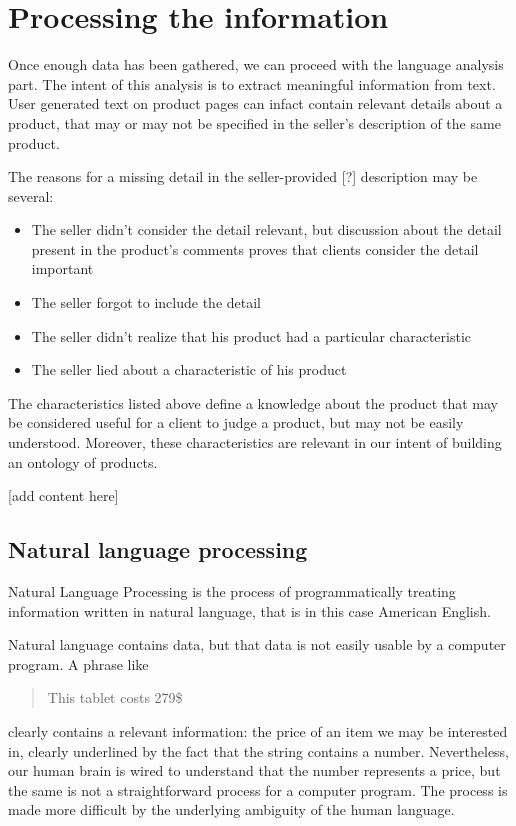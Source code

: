 \documentclass[LaM,binding=0.6cm]{sapthesis}
\begin{document}
\chapter{Processing the information}

Once enough data has been gathered, we can proceed with the language analysis part.
The intent of this analysis is to extract meaningful information from text. User generated text on product pages can infact contain relevant details about a product, that may or may not be specified in the seller's description of the same product. 

The reasons for a missing detail in the seller-provided [?] description may be several:
\begin{itemize}
	\item The seller didn't consider the detail relevant, but discussion about the detail present in the product's comments proves that clients consider the detail important
	\item The seller forgot to include the detail
	\item The seller didn't realize that his product had a particular characteristic
	\item The seller lied about a characteristic of his product
\end{itemize}

The characteristics listed above define a knowledge about the product that may be considered useful for a client to judge a product, but may not be easily understood. Moreover, these characteristics are relevant in our intent of building an ontology of products.

[add content here]

\section{Natural language processing}

Natural Language Processing is the process of programmatically treating information written in natural language, that is in this case American English. 

Natural language contains data, but that data is not easily usable by a computer program. A phrase like

\begin{quote}
This tablet costs 279\$
\end{quote}

clearly contains a relevant information: the price of an item we may be interested in, clearly underlined by the fact that the string contains a number. Nevertheless, our human brain is wired to understand that the number represents a price, but the same is not a straightforward process for a computer program. The process is made more difficult by the underlying ambiguity of the human language. 
\end{document}
